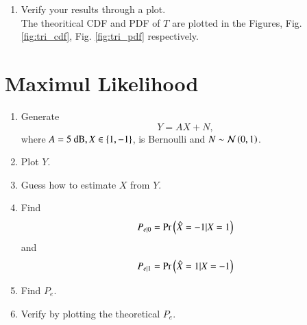 \documentclass[journal,12pt,twocolumn]{IEEEtran}
\renewcommand\thesection{\arabic{section}}
\begin{document}
\begin{enumerate}[label=\thesection.\arabic*
,ref=\thesection.\theenumi]
\solution
For calculating PDF, we know that
\begin{align}
	T &= U_1+U_2
	\\
	f_T(t) &= \int^{\infty}_{-\infty}f_{U_1}(u)f_{U_2}(t-u)dt
	\\
	f_T(t) &= \int^{2}_{0}f_{U_1}(u)f_{U_2}(t-u)dt
\end{align}
If $0<t<1$,
\begin{align}
	f_T(t) &= \int^{1}_{0}f_{U_2}(t-u)dt
	\\
	f_T(t) &= \int^{t}_{0}f_{U_2}(t-u)dt
	\\
	f_T(t) &= t
\end{align}
If $1<t<2$,
\begin{align}
	f_T(t) &= \int^{2}_{1}f_{U_2}(t-u)dt
	\\
	f_T(t) &= \int^{t}_{1}f_{U_2}(t-u)dt
	\\
	f_T(t) &= 2-t
\end{align}
For CDF,
\begin{align}
    F_T(x) &= \int _{-\infty} ^x p_T(t) dt
    \\
    F_T(x) &= 
    \begin{cases}
        0, & x \in (-\infty,0) \\
        \frac{x^2}{2}, & x \in (0,1) \\
        -\frac{x^2}{2} + 2x - 1, & x \in (1, 2) \\
        1, & x \in (2,\infty)
    \end{cases}
\end{align}

\item Verify your results through a plot.\\
\solution
The theoritical CDF and PDF of $T$ are plotted in the Figures, Fig. \ref{fig:tri_cdf}, Fig. \ref{fig:tri_pdf} respectively.
\end{enumerate}
\section{Maximul Likelihood}
\begin{enumerate}[label=\thesection.\arabic*
,ref=\thesection.\theenumi]
\item Generate 
\begin{equation}
Y = AX+N,
\end{equation}
where $A = 5 \text{ dB}, X \in \left\{1,-1\right\}$,  is Bernoulli and $N \sim \mathcal{N}\left(0,1\right)$.
	\item Plot $Y$.
	\item Guess how to estimate $X$ from $Y$.
\item
\label{ml-ch4_sim}
Find 
\begin{equation}
	P_{e|0} = \Pr\left(\hat{X} = -1|X=1\right)
\end{equation}
and 
\begin{equation}
	P_{e|1} = \Pr\left(\hat{X} = 1|X=-1\right)
\end{equation}
%
\item Find $P_e$.
%
\item
Verify by plotting  the theoretical $P_e$.  
		\end{enumerate}
\end{document}

